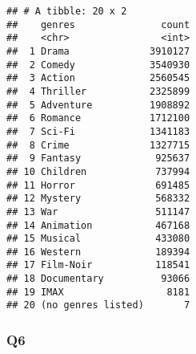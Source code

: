 \documentclass[
]{article}
\newenvironment{Shaded}{\begin{snugshade}}{\end{snugshade}}
\newcommand{\CharTok}[1]{\textcolor[rgb]{0.31,0.60,0.02}{#1}}
\newcommand{\CommentTok}[1]{\textcolor[rgb]{0.56,0.35,0.01}{\textit{#1}}}
\newcommand{\DataTypeTok}[1]{\textcolor[rgb]{0.13,0.29,0.53}{#1}}
\newcommand{\DecValTok}[1]{\textcolor[rgb]{0.00,0.00,0.81}{#1}}
\newcommand{\KeywordTok}[1]{\textcolor[rgb]{0.13,0.29,0.53}{\textbf{#1}}}
\newcommand{\NormalTok}[1]{#1}
\newcommand{\OperatorTok}[1]{\textcolor[rgb]{0.81,0.36,0.00}{\textbf{#1}}}
\newcommand{\StringTok}[1]{\textcolor[rgb]{0.31,0.60,0.02}{#1}}
\begin{document}
\begin{Shaded}
\end{Shaded}

\begin{verbatim}
## # A tibble: 20 x 2
##    genres               count
##    <chr>                <int>
##  1 Drama              3910127
##  2 Comedy             3540930
##  3 Action             2560545
##  4 Thriller           2325899
##  5 Adventure          1908892
##  6 Romance            1712100
##  7 Sci-Fi             1341183
##  8 Crime              1327715
##  9 Fantasy             925637
## 10 Children            737994
## 11 Horror              691485
## 12 Mystery             568332
## 13 War                 511147
## 14 Animation           467168
## 15 Musical             433080
## 16 Western             189394
## 17 Film-Noir           118541
## 18 Documentary          93066
## 19 IMAX                  8181
## 20 (no genres listed)       7
\end{verbatim}

\hypertarget{q6}{%
\subsubsection{Q6}\label{q6}}

\begin{Shaded}
\end{Shaded}
\end{document}
